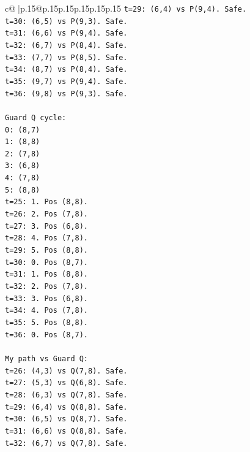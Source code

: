 \documentclass{article}
\begin{document}
{\begin{supertabular}{c@{$\;$}|p{.15\linewidth}@{}p{.15\linewidth}p{.15\linewidth}p{.15\linewidth}p{.15\linewidth}p{.15\linewidth}}
{{{\texttt{t=29: (6,4) vs P(9,4). Safe.} \\
\texttt{t=30: (6,5) vs P(9,3). Safe.} \\
\texttt{t=31: (6,6) vs P(9,4). Safe.} \\
\texttt{t=32: (6,7) vs P(8,4). Safe.} \\
\texttt{t=33: (7,7) vs P(8,5). Safe.} \\
\texttt{t=34: (8,7) vs P(8,4). Safe.} \\
\texttt{t=35: (9,7) vs P(9,4). Safe.} \\
\texttt{t=36: (9,8) vs P(9,3). Safe.} \\
\\ 
\texttt{Guard Q cycle:} \\
\texttt{0: (8,7)} \\
\texttt{1: (8,8)} \\
\texttt{2: (7,8)} \\
\texttt{3: (6,8)} \\
\texttt{4: (7,8)} \\
\texttt{5: (8,8)} \\
\texttt{t=25: 1. Pos (8,8).} \\
\texttt{t=26: 2. Pos (7,8).} \\
\texttt{t=27: 3. Pos (6,8).} \\
\texttt{t=28: 4. Pos (7,8).} \\
\texttt{t=29: 5. Pos (8,8).} \\
\texttt{t=30: 0. Pos (8,7).} \\
\texttt{t=31: 1. Pos (8,8).} \\
\texttt{t=32: 2. Pos (7,8).} \\
\texttt{t=33: 3. Pos (6,8).} \\
\texttt{t=34: 4. Pos (7,8).} \\
\texttt{t=35: 5. Pos (8,8).} \\
\texttt{t=36: 0. Pos (8,7).} \\
\\ 
\texttt{My path vs Guard Q:} \\
\texttt{t=26: (4,3) vs Q(7,8). Safe.} \\
\texttt{t=27: (5,3) vs Q(6,8). Safe.} \\
\texttt{t=28: (6,3) vs Q(7,8). Safe.} \\
\texttt{t=29: (6,4) vs Q(8,8). Safe.} \\
\texttt{t=30: (6,5) vs Q(8,7). Safe.} \\
\texttt{t=31: (6,6) vs Q(8,8). Safe.} \\
\texttt{t=32: (6,7) vs Q(7,8). Safe.} \\
}}}
\end{supertabular}}
\end{document}
